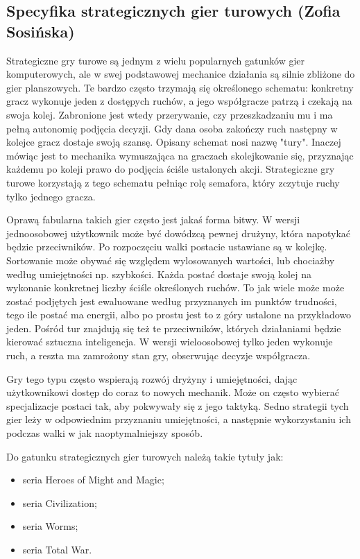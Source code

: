 \subsection{Specyfika strategicznych gier turowych (Zofia Sosińska)}
Strategiczne gry turowe są jednym z wielu popularnych gatunków gier komputerowych, ale w swej podstawowej mechanice działania są silnie zbliżone do
gier planszowych. Te bardzo często trzymają się określonego schematu: konkretny gracz wykonuje jeden z dostępych ruchów, a jego współgracze patrzą i czekają 
na swoja kolej. Zabronione jest wtedy przerywanie, czy przeszkadzaniu mu i ma pełną autonomię podjęcia decyzji. Gdy dana osoba zakończy ruch następny w kolejce gracz 
dostaje swoją szansę. Opisany schemat nosi nazwę "tury". Inaczej mówiąc jest to mechanika wymuszająca na graczach skolejkowanie się, przyznając każdemu po koleji  
prawo do podjęcia ściśle ustalonych akcji. Strategiczne gry turowe korzystają z tego schematu pełniąc rolę semafora, który zczytuje ruchy tylko jednego gracza.

Oprawą fabularna takich gier często jest jakaś forma bitwy. W wersji jednoosobowej użytkownik może być dowódzcą pewnej drużyny, która napotykać będzie przeciwników. Po 
rozpoczęciu walki postacie ustawiane są w kolejkę. Sortowanie może obywać się względem wylosowanych wartości, lub chociażby według umiejętności np. szybkości. Każda postać
 dostaje swoją kolej na wykonanie konkretnej liczby ściśle określonych ruchów. To jak wiele może może zostać podjętych jest ewaluowane według przyznanych im punktów 
 trudności, tego ile postać ma energii, albo po prostu jest to z góry ustalone na przykładowo jeden. Pośród tur znajdują się też te przeciwników, których działaniami będzie 
 kierować sztuczna inteligencja. W wersji wieloosobowej tylko jeden wykonuje ruch, a reszta ma zamrożony stan gry, obserwując decyzje współgracza.

Gry tego typu często wspierają rozwój dryżyny i umiejętności, dając użytkownikowi dostęp do coraz to nowych mechanik. Może on często wybierać specjalizacje postaci tak, aby 
pokwywały się z jego taktyką. Sedno strategii tych gier leży w odpowiednim przyznaniu umiejętności, a następnie wykorzystaniu ich podczas walki w jak naoptymalniejszy sposób.

Do gatunku strategicznych gier turowych należą takie tytuły jak:
\begin{itemize}
  \item seria Heroes of Might and Magic;
  \item seria Civilization;
  \item seria Worms;
  \item seria Total War.
\end{itemize}
